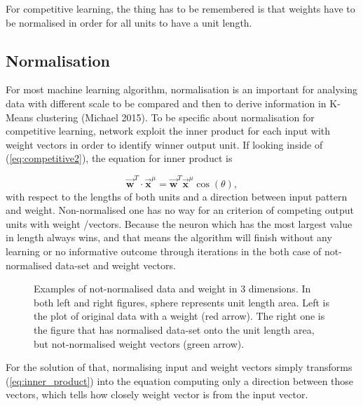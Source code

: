 \documentclass[12pt,a4paper]{report}
\begin{document}
\bigskip
For competitive learning, the thing has to be remembered is that weights have to be normalised in order for all units to have a unit length.

\subsection{Normalisation}
For most machine learning algorithm, normalisation is an important for analysing data with different scale to be compared and then to derive information in K-Means clustering (Michael 2015). To be specific about normalisation for competitive learning, network exploit the inner product for each input with weight vectors in order to identify winner output unit. If looking inside of (\ref{eq:competitive2}), the equation for inner product is

\begin{equation}\label{eq:inner_product}
    \vec{\mathbf{w}}^T \cdot \vec{\mathbf{x}}^\mu = \vec{\mathbf{w}}^T\vec{\mathbf{x}}^\mu \cos(\theta),
\end{equation}
with respect to the lengths of both units and a direction between input pattern and weight. Non-normalised one has no way for an criterion of competing output units with weight /vectors. Because the neuron which has the most largest value in length always wins, and that means the algorithm will finish without any learning or no informative outcome through iterations in the both case of not-normalised data-set and weight vectors.
\begin{figure}[thpb] \label{fig:not_norm_data}
    \centering
	\caption{Examples of not-normalised data and weight in 3 dimensions. In both left and right figures, sphere represents unit length area. Left is the plot of original data with a weight (red arrow). The right one is the figure that has normalised data-set onto the unit length area, but not-normalised weight vectors (green arrow).}
\end{figure}

\bigskip
For the solution of that, normalising input and weight vectors simply transforms (\ref{eq:inner_product}) into the equation computing only a direction between those vectors, which tells how closely weight vector is from the input vector. 
\end{document}
